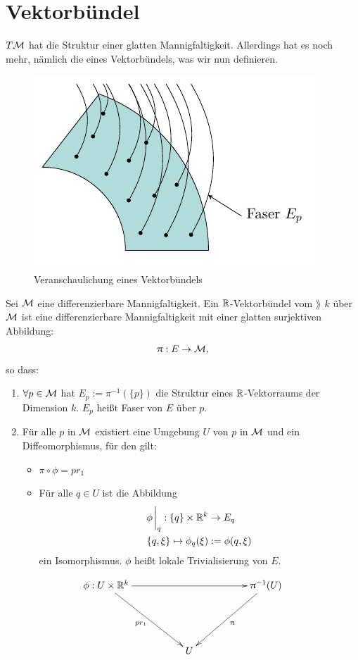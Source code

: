 \section{Vektorbündel}
$T\mathcal{M}$ hat die Struktur einer glatten Mannigfaltigkeit.
Allerdings hat es noch mehr, nämlich die eines Vektorbündels, was wir nun definieren.
\begin{figure}[H]
\centering
\includegraphics[scale=1.1]{figures/tikz/vectorbundel.pdf}
\caption{Veranschaulichung eines Vektorbündels}
\label{img:tangentialbuendel}
\end{figure}
\begin{defs}[Vektorbündel]
Sei $\mathcal{M}$ eine differenzierbare Mannigfaltigkeit.
Ein $\mathbb{R}$-Vektorbündel vom $\rang$ $k$ über $\mathcal{M}$ ist eine differenzierbare Mannigfaltigkeit mit einer glatten surjektiven Abbildung:
\begin{align*}
\uppi: E \to \mathcal{M},
\end{align*}
so dass:
\begin{enumerate}
\item $\forall p \in \mathcal{M}$ hat $E_p:= \pi^{-1}( \{ p \})$ die Struktur eines $\mathbb{R}$-Vektorraums der Dimension $k$.
$E_p$ heißt Faser von $E$ über $p$.
\item Für alle $p$ in $\mathcal{M}$ existiert eine Umgebung $U$ von $p$ in $\mathcal{M}$ und ein Diffeomorphismus, für den gilt:
\begin{itemize}
\item $\pi \circ \phi = p r_1$
\item Für alle $q \in U$ ist die Abbildung
\begin{align*}
&\phi\eval_q : \{ q \} \times \R^k \to E_q\\
&\{ q, \xi \} \mapsto \phi_q (\xi) := \phi(q, \xi)
\end{align*}
ein Isomorphismus.
$\phi$ heißt lokale Trivialisierung von $E$.
\end{itemize}
\end{enumerate}
\begin{align*}
\begin{xy}
\xymatrix@=0.15\linewidth{
      \phi: U \times \R^k \ar[rr] \ar[rd]_{pr_1}  &     &  \pi^{-1}(U) \ar[dl]^{\pi}  \\
                             &  U  &}
\end{xy}
\end{align*}
\end{defs}
